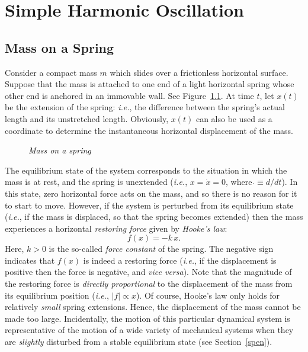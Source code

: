 \chapter{Simple Harmonic Oscillation}
\section{Mass on a Spring}\label{s2.1}
Consider a compact mass $m$ which slides over a  frictionless horizontal surface. Suppose that
the mass is attached
to one end of a light horizontal spring whose other end is anchored in an immovable wall. See
Figure~\ref{f2.1}. At time $t$, let $x(t)$ be the extension of the spring: {\em i.e.}, the difference between
the spring's actual length and its unstretched length. Obviously, $x(t)$ can also be used as
a coordinate to determine the instantaneous horizontal displacement of the mass. 

\begin{figure}
\centerline{}
\caption{\em Mass on a spring}\label{f2.1}   
\end{figure}

The equilibrium state of the system corresponds to the situation in which
the mass is at rest, and the spring is unextended ({\em i.e.}, $x=\dot{x}=0$, where $\dot{}\equiv d/dt$).
In this state, zero horizontal force acts on the mass, and so there is no reason for it to start to move.
However, if the system is perturbed from its equilibrium state ({\em i.e.}, if the mass is displaced, so that the
spring becomes extended) then the mass experiences a horizontal {\em restoring force}\/ given by {\em Hooke's law}:
\begin{equation}
f (x)= -k\,x.
\end{equation}
Here, $k>0$ is the so-called {\em force constant}\/ of the spring. The negative sign indicates that $f(x)$ is indeed a restoring force ({\em i.e.}, if the displacement is
positive then the force is negative, and {\em vice versa}). 
Note that the magnitude of the restoring
force is {\em directly proportional}\/ to the displacement of the mass from its equilibrium 
position 
({\em i.e.}, $|f|\propto x$). Of course, Hooke's law only holds for relatively {\em small}\/ spring extensions.
Hence, the displacement of the mass cannot be made too large.
Incidentally, the motion of this particular dynamical system is representative of the
motion of a wide variety of mechanical systems when they are {\em slightly}\/ disturbed from a stable equilibrium state (see Section~\ref{spen}).

